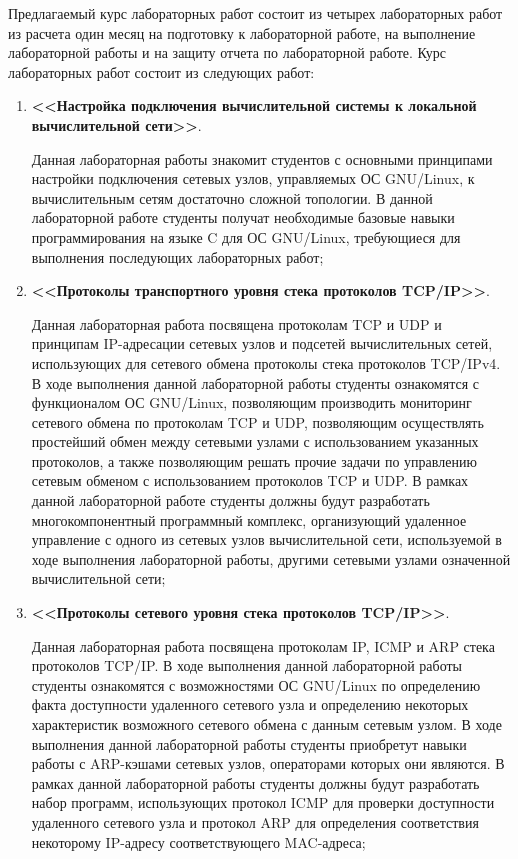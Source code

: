	Предлагаемый курс лабораторных работ состоит из четырех лабораторных работ из расчета один месяц на подготовку к лабораторной работе, на выполнение
	лабораторной работы и на защиту отчета по лабораторной работе. Курс лабораторных работ состоит из следующих работ:

	\begin{enumerate}[1.]

		\item {\bf<<Настройка подключения вычислительной системы к локальной вычислительной сети>>}.

			Данная лабораторная работы знакомит студентов с основными принципами настройки подключения сетевых узлов, управляемых ОС
			GNU/Linux, к вычислительным сетям достаточно сложной топологии. В данной лабораторной работе студенты получат необходимые базовые навыки
			программирования на языке C для ОС GNU/Linux, требующиеся для выполнения последующих лабораторных работ;

		\item {\bf<<Протоколы транспортного уровня стека протоколов TCP/IP>>}.

			Данная лабораторная работа посвящена протоколам TCP и UDP и принципам IP-адресации сетевых узлов и подсетей вычислительных сетей, использующих
			для сетевого обмена протоколы стека протоколов TCP/IPv4. В ходе выполнения данной лабораторной работы студенты ознакомятся с функционалом ОС
			GNU/Linux, позволяющим производить мониторинг сетевого обмена по протоколам TCP и UDP, позволяющим осуществлять простейший обмен между
			сетевыми узлами с использованием указанных протоколов, а также позволяющим решать прочие задачи по управлению сетевым обменом с использованием
			протоколов TCP и UDP. В рамках данной лабораторной работе студенты должны будут разработать многокомпонентный программный комплекс, организующий
			удаленное управление с одного из сетевых узлов вычислительной сети, используемой в ходе выполнения лабораторной работы, другими сетевыми узлами
			означенной вычислительной сети;

		\item {\bf<<Протоколы сетевого уровня стека протоколов TCP/IP>>}.

			Данная лабораторная работа посвящена протоколам IP, ICMP и ARP стека протоколов TCP/IP. В ходе выполнения данной лабораторной работы студенты
			ознакомятся с возможностями ОС GNU/Linux по определению факта доступности удаленного сетевого узла и определению некоторых характеристик возможного
			сетевого обмена с данным сетевым узлом. В ходе выполнения данной лабораторной работы студенты приобретут навыки работы с ARP-кэшами
			сетевых узлов, операторами которых они являются. В рамках данной лабораторной работы студенты должны будут разработать набор программ, использующих
			протокол ICMP для проверки доступности удаленного сетевого узла и протокол ARP для определения соответствия некоторому IP-адресу
			соответствующего MAC-адреса;
		

\end{enumerate}
